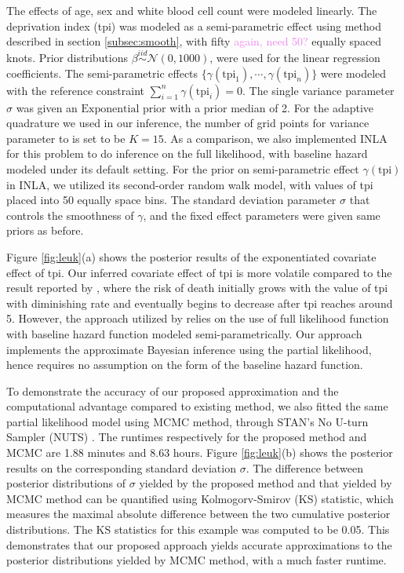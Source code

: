 \documentclass[ba]{imsart}
\newcommand{\alex}[1]{\textcolor{violet}{{ }#1}}
\begin{document}
The effects of age, sex and white blood cell count were modeled linearly. The deprivation index (tpi) was modeled as a semi-parametric effect using method described in section \ref{subsec:smooth}, with fifty\alex{again, need 50?} equally spaced knots. Prior distributions $\beta \stackrel{iid}{\sim} \mathcal{N}(0, 1000)$, were used for the linear regression coefficients. The semi-parametric effects $\{\gamma(\text{tpi}_1), \cdots, \gamma(\text{tpi}_n)\}$ were modeled with the reference constraint $\sum_{i=1}^{n}\gamma(\text{tpi}_i) = 0$. The single variance parameter $\sigma$ was given an $\text{Exponential}$ prior with a prior median of 2. For the adaptive quadrature we used in our inference, the number of grid points for variance parameter to is set to be $K = 15$. As a comparison, we also implemented INLA for this problem to do inference on the full likelihood, with baseline hazard modeled under its default setting. For the prior on semi-parametric effect $\gamma(\text{tpi})$ in INLA, we utilized its second-order random walk model, with values of tpi placed into 50 equally space bins. The standard deviation parameter $\sigma$ that controls the smoothness of $\gamma$, and the fixed effect parameters were given same priors as before.

Figure \ref{fig:leuk}(a) shows the posterior results of the exponentiated covariate effect of tpi. Our inferred covariate effect of tpi is more volatile compared to the result reported by \cite{inlacoxph}, where the risk of death initially grows with the value of tpi with diminishing rate and eventually begins to decrease after tpi reaches around 5. However, the approach utilized by \cite{inlacoxph} relies on the use of full likelihood function with baseline hazard function modeled semi-parametrically. Our approach implements the approximate Bayesian inference using the partial likelihood, hence requires no assumption on the form of the baseline hazard function. 

To demonstrate the accuracy of our proposed approximation and the computational advantage compared to existing method, we also fitted the same partial likelihood model using MCMC method, through STAN's No U-turn Sampler (NUTS) \citep{NUTS}. The runtimes respectively for the proposed method and MCMC are 1.88 minutes and 8.63 hours. Figure \ref{fig:leuk}(b) shows the posterior results on the corresponding standard deviation $\sigma$. The difference between posterior distributions of $\sigma$ yielded by the proposed method and that yielded by MCMC method can be quantified using Kolmogorv-Smirov (KS) statistic, which measures the maximal absolute difference between the two cumulative posterior distributions. The KS statistics for this example was computed to be 0.05. This demonstrates that our proposed approach yields accurate approximations to the posterior distributions yielded by MCMC method, with a much faster runtime.
\end{document}
